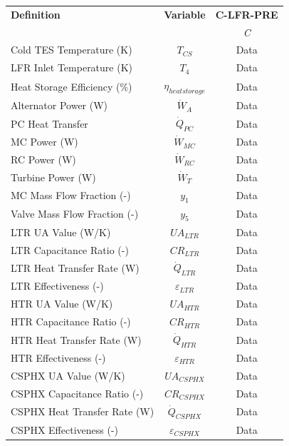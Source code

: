 \begin{paracol}{2}
\begin{specialtable}[htbp]
    \caption{Calculated system parameters for salt charging C-LFR-PRE cycle configuration with TES cold storage set to 663.2 K.\label{tab-c-lfr-pre}}
    \begin{tabular}{lcc}
    \toprule
    \textbf{Definition} & \textbf{Variable} & \textbf{C-LFR-PRE}\\
    & & \textit{C}\\
    \midrule	
    Cold TES Temperature (K)	&	$T_{CS}$	&	Data	\\
    LFR Inlet Temperature (K)	&	$T_{4}$	&	Data	\\
    Heat Storage Efficiency (\%)	&	$\eta_{heatstorage}$	&	Data	\\
    Alternator Power (W)	&	$\dot{W}_{A}$	&	Data	\\
    PC Heat Transfer	&	$\dot{Q}_{PC}$	&	Data	\\
    MC Power (W)	&	$\dot{W}_{MC}$	&	Data	\\
    RC Power (W)	&	$\dot{W}_{RC}$	&	Data	\\
    Turbine Power (W)	&	$\dot{W}_{T}$	&	Data	\\
    MC Mass Flow Fraction (-)	&	$y_{1}$	&	Data	\\
    Valve Mass Flow Fraction (-)	&	$y_{5}$	&	Data	\\
    LTR UA Value (W/K)	&	$UA_{LTR}$	&	Data	\\
    LTR Capacitance Ratio (-)	&	$CR_{LTR}$	&	Data	\\
    LTR Heat Transfer Rate (W)	&	$\dot{Q}_{LTR}$	&	Data	\\
    LTR Effectiveness (-)	&	$\varepsilon_{LTR}$	&	Data	\\
    HTR UA Value (W/K)	&	$UA_{HTR}$	&	Data	\\
    HTR Capacitance Ratio (-)	&	$CR_{HTR}$	&	Data	\\
    HTR Heat Transfer Rate (W)	&	$\dot{Q}_{HTR}$	&	Data	\\
    HTR Effectiveness (-)	&	$\varepsilon_{HTR}$	&	Data	\\
    CSPHX UA Value (W/K)	&	$UA_{CSPHX}$	&	Data	\\
    CSPHX Capacitance Ratio (-)	&	$CR_{CSPHX}$	&	Data	\\
    CSPHX Heat Transfer Rate (W)	&	$\dot{Q}_{CSPHX}$	&	Data	\\
    CSPHX Effectiveness (-)	&	$\varepsilon_{CSPHX}$	&	Data	\\
    \bottomrule
    \end{tabular}\\
\end{specialtable}


\end{paracol}
